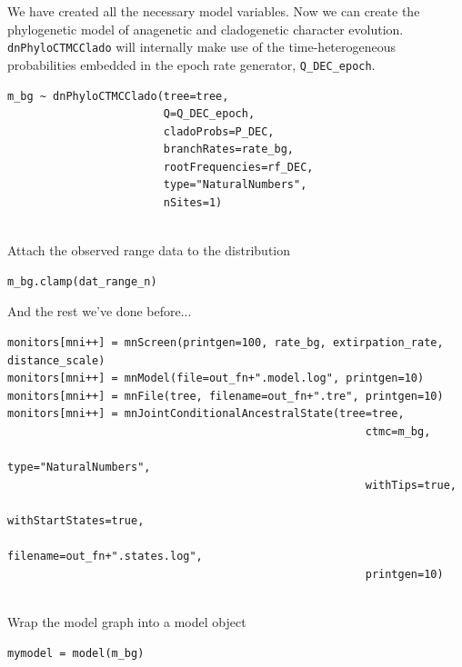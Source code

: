 We have created all the necessary model variables.
Now we can create the phylogenetic model of anagenetic and cladogenetic character evolution.
{\tt dnPhyloCTMCClado} will internally make use of the time-heterogeneous probabilities embedded in the epoch rate generator, {\tt Q\_DEC\_epoch}.
\begin{snugshade}
\begin{lstlisting}
m_bg ~ dnPhyloCTMCClado(tree=tree,
                        Q=Q_DEC_epoch,
                        cladoProbs=P_DEC,
                        branchRates=rate_bg,
                        rootFrequencies=rf_DEC,
                        type="NaturalNumbers",
                        nSites=1)
                  
\end{lstlisting}
\end{snugshade}

Attach the observed range data to the distribution

\begin{snugshade}
\begin{lstlisting}
m_bg.clamp(dat_range_n)
\end{lstlisting}
\end{snugshade}

And the rest we've done before...

\begin{snugshade}
\begin{lstlisting}
monitors[mni++] = mnScreen(printgen=100, rate_bg, extirpation_rate, distance_scale)
monitors[mni++] = mnModel(file=out_fn+".model.log", printgen=10)
monitors[mni++] = mnFile(tree, filename=out_fn+".tre", printgen=10)
monitors[mni++] = mnJointConditionalAncestralState(tree=tree,
                                                       ctmc=m_bg,
                                                       type="NaturalNumbers",
                                                       withTips=true,
                                                       withStartStates=true,
                                                       filename=out_fn+".states.log",
                                                       printgen=10)
                                                       
\end{lstlisting}
\end{snugshade}

Wrap the model graph into a model object

\begin{snugshade}
\begin{lstlisting}
mymodel = model(m_bg)
\end{lstlisting}
\end{snugshade}

